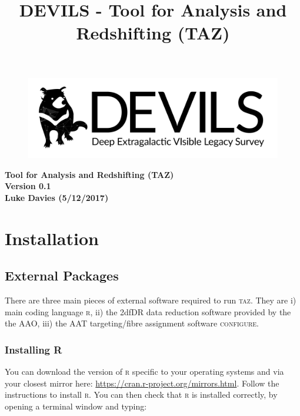 \documentclass[12pt]{article}
\begin{document}
\title{DEVILS - Tool for Analysis and Redshifting (TAZ) }


\begin{figure}
\begin{center}
\includegraphics[scale=0.8]{devils-logo_big.png}
\end{center}
\end{figure}

\begin{center}
\Huge {\textcolor{PineGreen}{\textbf{Tool for Analysis and Redshifting (TAZ)}}}\\
\Huge {\textcolor{PineGreen}{\textbf{ Version 0.1}}}\\
\Large \textbf{Luke Davies (5/12/2017)}\\
\end{center}
\normalsize


\section{Installation}

\subsection{External Packages}

There are three main pieces of external software required to run \textsc{taz}. They are i) main coding language \textsc{r}, ii) the 2dfDR data reduction software provided by the the AAO, iii) the AAT targeting/fibre assignment software \textsc{configure}. 

\subsubsection{Installing R}

You can download the version of \textsc{r} specific to your operating systems and via your closest mirror here: \url{https://cran.r-project.org/mirrors.html}. Follow the instructions to install \textsc{r}. You can then check that \textsc{r} is installed correctly, by opening a terminal window and typing: \\
\end{document}
